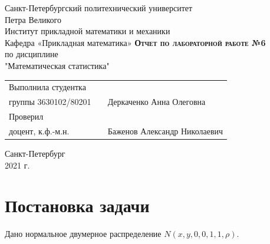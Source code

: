\documentclass[12pt,a4paper]{article}
\begin{document}
    \begin{titlepage}
        \begin{center}
            \large
            Санкт-Петербургский политехнический университет\\Петра Великого\\
            \vspace{0.5cm}
            Институт прикладной математики и механики\\
            \vspace{0.25cm}
            Кафедра «Прикладная математика»
            \vfill
            \textsc{\LARGE\textbf{Отчет по лабораторной работе №6}}\\[5mm]
            \Large
            по дисциплине\\"Математическая статистика"
        \end{center}
        \vfill
        \begin{tabular}{l p{} l}
            Выполнила студентка\\группы 3630102/80201 && Деркаченко Анна Олеговна
            \vspace{0.25cm}
            \\Проверил\\доцент, к.ф.-м.н. && Баженов Александр Николаевич
        \end{tabular}
        \vfill
        \begin{center}
            Санкт-Петербург\\2021 г.
        \end{center}
    \end{titlepage}

\newpage
\begin{center}
    \tableofcontents
    \setcounter{page}{2}
\end{center}
\newpage
\begin{center}
    \listoffigures
\end{center}

\newpage
\section{Постановка задачи}
Дано нормальное двумерное распределение $N(x,y,0,0,1,1,\rho)$.
\end{document}
